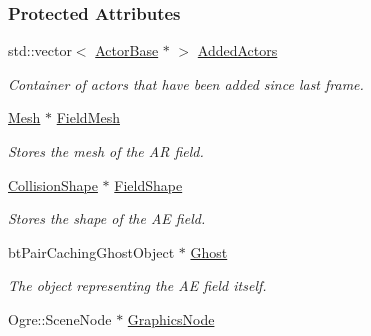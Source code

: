 \subsubsection*{Protected Attributes}
\begin{DoxyCompactItemize}
\item 
\hypertarget{classMezzanine_1_1AreaEffect_a9a7e333c5e52fd5d7ae892f4691dbc16}{
std::vector$<$ \hyperlink{classMezzanine_1_1ActorBase}{ActorBase} $\ast$ $>$ \hyperlink{classMezzanine_1_1AreaEffect_a9a7e333c5e52fd5d7ae892f4691dbc16}{AddedActors}}
\label{classMezzanine_1_1AreaEffect_a9a7e333c5e52fd5d7ae892f4691dbc16}

\begin{DoxyCompactList}\small\item\em Container of actors that have been added since last frame. \item\end{DoxyCompactList}\item 
\hypertarget{classMezzanine_1_1AreaEffect_a5ca3984a40d2678b786f518667fde27f}{
\hyperlink{classMezzanine_1_1Mesh}{Mesh} $\ast$ \hyperlink{classMezzanine_1_1AreaEffect_a5ca3984a40d2678b786f518667fde27f}{FieldMesh}}
\label{classMezzanine_1_1AreaEffect_a5ca3984a40d2678b786f518667fde27f}

\begin{DoxyCompactList}\small\item\em Stores the mesh of the AR field. \item\end{DoxyCompactList}\item 
\hypertarget{classMezzanine_1_1AreaEffect_a54f08718bc742934f2ef6b4bd978c9d2}{
\hyperlink{classMezzanine_1_1CollisionShape}{CollisionShape} $\ast$ \hyperlink{classMezzanine_1_1AreaEffect_a54f08718bc742934f2ef6b4bd978c9d2}{FieldShape}}
\label{classMezzanine_1_1AreaEffect_a54f08718bc742934f2ef6b4bd978c9d2}

\begin{DoxyCompactList}\small\item\em Stores the shape of the AE field. \item\end{DoxyCompactList}\item 
\hypertarget{classMezzanine_1_1AreaEffect_a16427c9805ea4c87faa84715ec04f97d}{
btPairCachingGhostObject $\ast$ \hyperlink{classMezzanine_1_1AreaEffect_a16427c9805ea4c87faa84715ec04f97d}{Ghost}}
\label{classMezzanine_1_1AreaEffect_a16427c9805ea4c87faa84715ec04f97d}

\begin{DoxyCompactList}\small\item\em The object representing the AE field itself. \item\end{DoxyCompactList}\item 
\hypertarget{classMezzanine_1_1AreaEffect_a6f025b9cd2ff505618eeaf6640319ab9}{
Ogre::SceneNode $\ast$ \hyperlink{classMezzanine_1_1AreaEffect_a6f025b9cd2ff505618eeaf6640319ab9}{GraphicsNode}}
\label{classMezzanine_1_1AreaEffect_a6f025b9cd2ff505618eeaf6640319ab9}


\end{DoxyCompactItemize}
